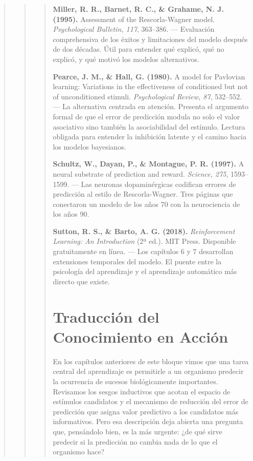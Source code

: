 \documentclass[
  letterpaper,
  DIV=11,
  numbers=noendperiod]{scrreprt}
\begin{document}
\begin{tcolorbox}[enhanced jigsaw, arc=.35mm, bottomrule=.15mm, breakable, colback=white, colframe=quarto-callout-note-color-frame, left=2mm, leftrule=.75mm, opacityback=0, rightrule=.15mm, toprule=.15mm]
\begin{quote}
\begin{quote}
\begin{quote}
\textbf{Miller, R. R., Barnet, R. C., \& Grahame, N. J. (1995).}
Assessment of the Rescorla-Wagner model. \emph{Psychological Bulletin,
117}, 363--386. --- Evaluación comprehensiva de los éxitos y
limitaciones del modelo después de dos décadas. Útil para entender qué
explicó, qué no explicó, y qué motivó los modelos alternativos.

\textbf{Pearce, J. M., \& Hall, G. (1980).} A model for Pavlovian
learning: Variations in the effectiveness of conditioned but not of
unconditioned stimuli. \emph{Psychological Review, 87}, 532--552. --- La
alternativa centrada en atención. Presenta el argumento formal de que el
error de predicción modula no solo el valor asociativo sino también la
asociabilidad del estímulo. Lectura obligada para entender la inhibición
latente y el camino hacia los modelos bayesianos.

\textbf{Schultz, W., Dayan, P., \& Montague, P. R. (1997).} A neural
substrate of prediction and reward. \emph{Science, 275}, 1593--1599. ---
Las neuronas dopaminérgicas codifican errores de predicción al estilo de
Rescorla-Wagner. Tres páginas que conectaron un modelo de los años 70
con la neurociencia de los años 90.

\textbf{Sutton, R. S., \& Barto, A. G. (2018).} \emph{Reinforcement
Learning: An Introduction} (2ª ed.). MIT Press. Disponible gratuitamente
en línea. --- Los capítulos 6 y 7 desarrollan extensiones temporales del
modelo. El puente entre la psicología del aprendizaje y el aprendizaje
automático más directo que existe.


\mbox{}%
\chapter{Traducción del Conocimiento en
Acción}\label{traducciuxf3n-del-conocimiento-en-acciuxf3n}

En los capítulos anteriores de este bloque vimos que una tarea central
del aprendizaje es permitirle a un organismo predecir la ocurrencia de
sucesos biológicamente importantes. Revisamos los sesgos inductivos que
acotan el espacio de estímulos candidatos y el mecanismo de reducción
del error de predicción que asigna valor predictivo a los candidatos más
informativos. Pero esa descripción deja abierta una pregunta que,
pensándolo bien, es la más urgente: ¿de qué sirve predecir si la
predicción no cambia nada de lo que el organismo hace?


\end{quote}
\end{quote}
\end{quote}
\end{tcolorbox}
\end{document}
